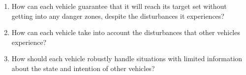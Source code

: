 \begin{enumerate}
\item How can each vehicle guarantee that it will reach its target set without getting into any danger zones, despite the disturbances it experiences?
\item How can each vehicle take into account the disturbances that other vehicles experience?
\item How should each vehicle robustly handle situations with limited information about the state and intention of other vehicles?
\end{enumerate}